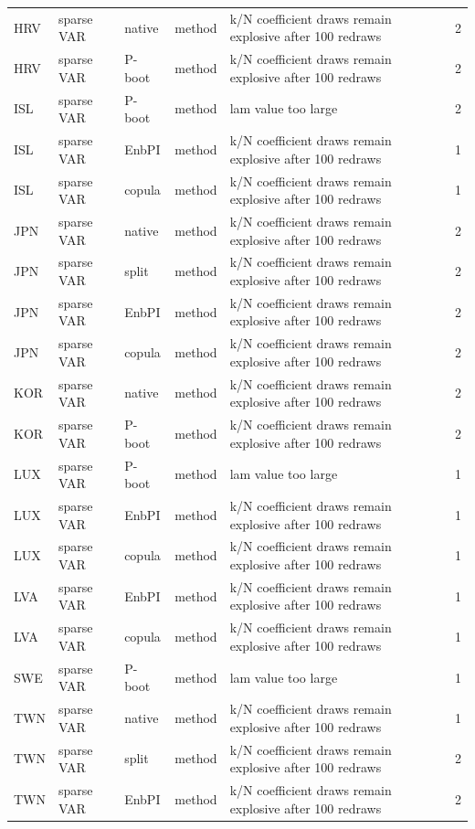 {\begin{longtable}{@{}lllp{1.6cm}p{6.2cm}r@{}}
HRV & sparse VAR & native & method & k/N coefficient draws remain explosive after 100 redraws & 2 \\
HRV & sparse VAR & P-boot & method & k/N coefficient draws remain explosive after 100 redraws & 2 \\
ISL & sparse VAR & P-boot & method & lam value too large & 2 \\
ISL & sparse VAR & EnbPI & method & k/N coefficient draws remain explosive after 100 redraws & 1 \\
ISL & sparse VAR & copula & method & k/N coefficient draws remain explosive after 100 redraws & 1 \\
JPN & sparse VAR & native & method & k/N coefficient draws remain explosive after 100 redraws & 2 \\
JPN & sparse VAR & split & method & k/N coefficient draws remain explosive after 100 redraws & 2 \\
JPN & sparse VAR & EnbPI & method & k/N coefficient draws remain explosive after 100 redraws & 2 \\
JPN & sparse VAR & copula & method & k/N coefficient draws remain explosive after 100 redraws & 2 \\
KOR & sparse VAR & native & method & k/N coefficient draws remain explosive after 100 redraws & 2 \\
KOR & sparse VAR & P-boot & method & k/N coefficient draws remain explosive after 100 redraws & 2 \\
LUX & sparse VAR & P-boot & method & lam value too large & 1 \\
LUX & sparse VAR & EnbPI & method & k/N coefficient draws remain explosive after 100 redraws & 1 \\
LUX & sparse VAR & copula & method & k/N coefficient draws remain explosive after 100 redraws & 1 \\
LVA & sparse VAR & EnbPI & method & k/N coefficient draws remain explosive after 100 redraws & 1 \\
LVA & sparse VAR & copula & method & k/N coefficient draws remain explosive after 100 redraws & 1 \\
SWE & sparse VAR & P-boot & method & lam value too large & 1 \\
TWN & sparse VAR & native & method & k/N coefficient draws remain explosive after 100 redraws & 1 \\
TWN & sparse VAR & split & method & k/N coefficient draws remain explosive after 100 redraws & 2 \\
TWN & sparse VAR & EnbPI & method & k/N coefficient draws remain explosive after 100 redraws & 2 \\

\end{longtable}}
